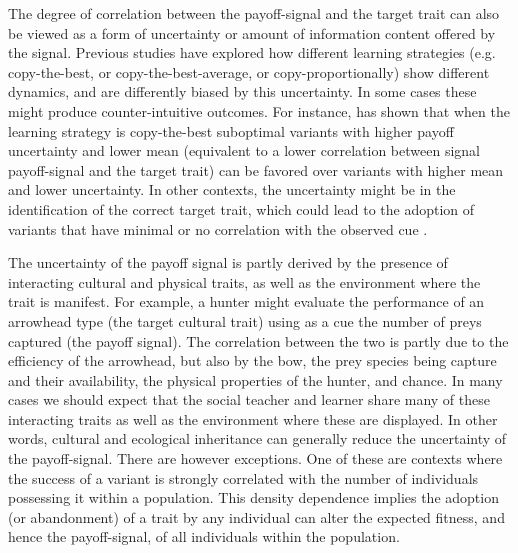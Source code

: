 \documentclass[preprint,authoryear]{elsarticle}
\begin{document}
The degree of correlation between the payoff-signal and the target trait can also be viewed as a form of uncertainty or amount of information content offered by the signal. Previous studies \citep{schlag1998,baldini2013,lake2012} have explored how different learning strategies (e.g. copy-the-best, or copy-the-best-average, or copy-proportionally) show different dynamics, and are differently biased by this uncertainty. In some cases these might produce counter-intuitive outcomes. For instance, \citet{baldini2013} has shown that when the learning strategy is  copy-the-best suboptimal variants with higher payoff uncertainty and lower mean (equivalent to a lower correlation between signal payoff-signal and the target trait) can be favored over variants with higher mean and lower uncertainty. In other contexts, the uncertainty might be in the identification of the correct target trait, which could lead to the adoption of variants that have minimal or no correlation with the observed cue \citep[cf. "evolutionary hitchhiking"][]{ackland2007}. 

The uncertainty of the payoff signal is partly derived by the presence of interacting cultural and physical traits, as well as the environment where the trait is manifest. For example, a hunter might evaluate the performance of an arrowhead type (the target cultural trait) using as a cue the number of preys captured (the payoff signal). The correlation between the two is partly due to the efficiency of the arrowhead, but also by the bow, the prey species being capture and their availability, the physical properties of the hunter, and chance. In many cases we should expect that the social teacher and learner share many of these interacting traits as well as the environment where these are displayed. In other words, cultural and ecological inheritance can generally reduce the uncertainty of the payoff-signal. There are however exceptions. One of these are contexts where the success of a variant is strongly correlated with the number of individuals possessing it within a population. This density dependence implies the adoption (or abandonment) of a trait by any individual can alter the expected fitness, and hence the payoff-signal, of all individuals within the population. 
\end{document}
